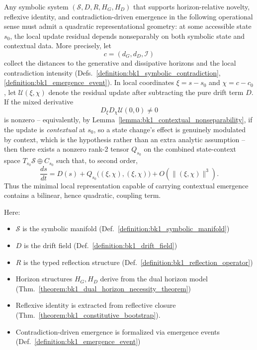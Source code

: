 \begin{theorem}
\label{theorem:bk1_quadratic_structure_necessity}
Any symbolic system $(\mathcal{S}, D, R, H_G, H_D)$ that supports
horizon-relative novelty, reflexive identity, and contradiction-driven emergence
in the following operational sense must admit a quadratic representational
geometry: at some accessible state \(s_0\), the local update residual depends
nonseparably on both symbolic state and contextual data. More precisely, let
\[
c=(d_G,d_D,\mathcal{I})
\]
collect the distances to the generative and dissipative horizons and the local
contradiction intensity (Defs.~\ref{definition:bk1_symbolic_contradiction},
\ref{definition:bk1_emergence_event}). In local coordinates
\(\xi=s-s_0\) and \(\chi=c-c_0\), let
\(\mathcal{U}(\xi,\chi)\) denote the residual update after subtracting the
pure drift term \(D\). If the mixed derivative
\[
D_\xi D_\chi \mathcal{U}(0,0)\neq 0
\]
is nonzero -- equivalently, by Lemma~\ref{lemma:bk1_contextual_nonseparability}, if the
update is \emph{contextual} at \(s_0\), so a state change's effect is genuinely modulated
by context, which is the hypothesis rather than an extra analytic assumption -- then there
exists a nonzero rank-2 tensor \(Q_{s_0}\) on the combined
state-context space \(T_{s_0}\mathcal{S}\oplus C_{s_0}\) such that, to second
order,
\[
\frac{ds}{dt}
=D(s)+Q_{s_0}\bigl((\xi,\chi),(\xi,\chi)\bigr)
+O(\|(\xi,\chi)\|^3).
\]
Thus the minimal local representation capable of carrying contextual emergence
contains a bilinear, hence quadratic, coupling term.

Here:
\begin{itemize}
    \item $\mathcal{S}$ is the symbolic manifold (Def.~\ref{definition:bk1_symbolic_manifold})
    \item $D$ is the drift field (Def.~\ref{definition:bk1_drift_field})
    \item $R$ is the typed reflection structure (Def.~\ref{definition:bk1_reflection_operator})
    \item Horizon structures $H_G, H_D$ derive from the dual horizon model (Thm.~\ref{theorem:bk1_dual_horizon_necessity_theorem})
    \item Reflexive identity is extracted from reflective closure (Thm.~\ref{theorem:bk1_constitutive_bootstrap}).
    \item Contradiction-driven emergence is formalized via emergence events (Def.~\ref{definition:bk1_emergence_event})
\end{itemize}
\end{theorem}

